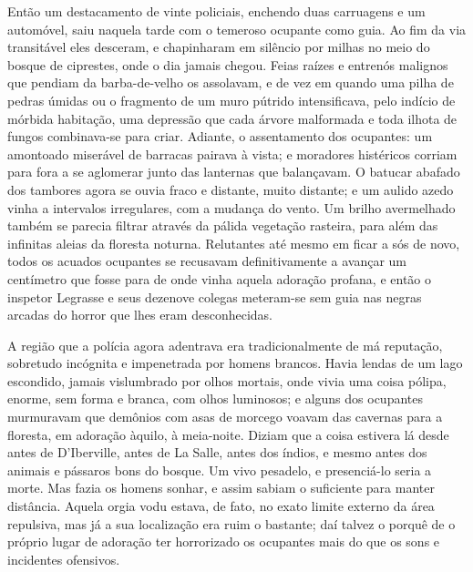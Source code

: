 Então um destacamento de vinte policiais, enchendo duas carruagens e um
automóvel, saiu naquela tarde com o temeroso ocupante como guia. Ao fim
da via transitável eles desceram, e chapinharam em silêncio por milhas
no meio do bosque de ciprestes, onde o dia jamais chegou. Feias raízes e
entrenós malignos que pendiam da barba-de-velho os assolavam, e de vez
em quando uma pilha de pedras úmidas ou o fragmento de um muro pútrido
intensificava, pelo indício de mórbida habitação, uma depressão que cada
árvore malformada e toda ilhota de fungos combinava-se para criar.
Adiante, o assentamento dos ocupantes: um amontoado miserável de
barracas pairava à vista; e moradores histéricos corriam para fora a se
aglomerar junto das lanternas que balançavam. O batucar abafado dos
tambores agora se ouvia fraco e distante, muito distante; e um aulido
azedo vinha a intervalos irregulares, com a mudança do vento. Um brilho
avermelhado também se parecia filtrar através da pálida vegetação
rasteira, para além das infinitas aleias da floresta noturna. Relutantes
até mesmo em ficar a sós de novo, todos os acuados ocupantes se
recusavam definitivamente a avançar um centímetro que fosse para de onde
vinha aquela adoração profana, e então o inspetor Legrasse e seus
dezenove colegas meteram-se sem guia nas negras arcadas do horror que
lhes eram desconhecidas.

A região que a polícia agora adentrava era tradicionalmente de má
reputação, sobretudo incógnita e impenetrada por homens brancos. Havia
lendas de um lago escondido, jamais vislumbrado por olhos mortais, onde
vivia uma coisa pólipa, enorme, sem forma e branca, com olhos luminosos;
e alguns dos ocupantes murmuravam que demônios com asas de morcego
voavam das cavernas para a floresta, em adoração àquilo, à meia-noite.
Diziam que a coisa estivera lá desde antes de D'Iberville, antes de La
Salle, antes dos índios, e mesmo antes
dos animais e pássaros bons do bosque. Um vivo pesadelo, e presenciá-lo
seria a morte. Mas fazia os homens sonhar, e assim sabiam o suficiente
para manter distância. Aquela orgia vodu estava, de fato, no exato
limite externo da área repulsiva, mas já a sua localização era ruim o
bastante; daí talvez o porquê de o próprio lugar de adoração ter
horrorizado os ocupantes mais do que os sons e incidentes ofensivos.

